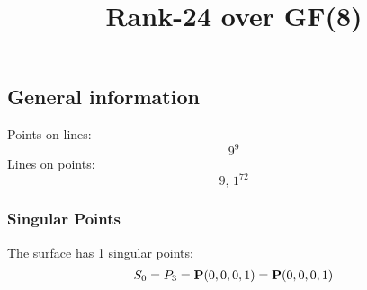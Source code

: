 \documentclass{article}
\newcommand\setTBstruts{\def\T{\rule{0pt}{2.6ex}}%
\def\B{\rule[-1.2ex]{0pt}{0pt}}}
\newcommand{\bP}{{\bf P}}
\begin{document}
 
\setTBstruts



{\allowdisplaybreaks%






\title{Rank-24 over GF(8)}
\author{}%
\maketitle%
%
{}



\subsection*{General information}
Points on lines:
$$
9^9$$
Lines on points:
$$
9,\,1^{72}$$
\subsubsection*{Singular Points}
The surface has 1 singular points:\\
\begin{align*}
S_{0} &= P_{3}=\bP(0, 0, 0, 1) = \bP(0, 0, 0, 1)\\
\end{align*}
}
\end{document}
